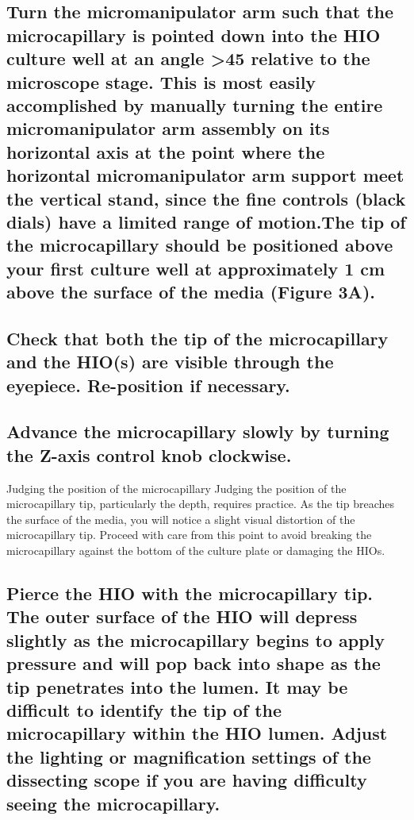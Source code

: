\documentclass[11pt]{article}
\begin{document}
\subsection{{\sffamily } Turn the micromanipulator arm such that the microcapillary is pointed down into the HIO culture well at an angle >45\textdegree{} relative to the microscope stage. This is most easily accomplished by manually turning the entire micromanipulator arm assembly on its horizontal axis at the point where the horizontal micromanipulator arm support meet the vertical stand, since the fine controls (black dials) have a limited range of motion.The tip of the microcapillary should be positioned above your first culture well at approximately 1 cm above the surface of the media (\textbf{Figure 3A}).}
\label{sec:orgheadline46}
\subsection{{\sffamily } Check that both the tip of the microcapillary and the HIO(s) are visible through the eyepiece. Re-position if necessary.}
\label{sec:orgheadline47}
\subsection{{\sffamily } Advance the microcapillary slowly by turning the Z-axis control knob clockwise.}
\label{sec:orgheadline48}
\begin{bclogo}[logo=\bcinfo, couleurBarre=Black, noborder=true, couleur=gray!10]{     Judging the position of the microcapillary}
Judging the position of the microcapillary tip, particularly the depth, requires practice. As the tip breaches the surface of the media, you will notice a slight visual distortion of the microcapillary tip. Proceed with care from this point to avoid breaking the microcapillary against the bottom of the culture plate or damaging the HIOs.\\
\end{bclogo}
\subsection{{\sffamily } Pierce the HIO with the microcapillary tip. The outer surface of the HIO will depress slightly as the microcapillary begins to apply pressure and will pop back into shape as the tip penetrates into the lumen. It may be difficult to identify the tip of the microcapillary within the HIO lumen. Adjust the lighting or magnification settings of the dissecting scope if you are having difficulty seeing the microcapillary.}
\label{sec:orgheadline49}
\end{document}
